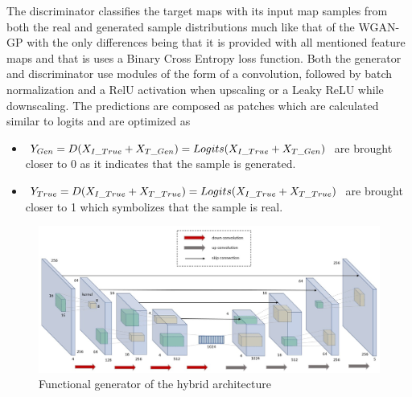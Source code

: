 \documentclass{Configuration_Files/PoliMi3i_thesis}
\begin{document}
The discriminator classifies the target maps with its input map samples from both the
 real and generated sample distributions much like that of the WGAN-GP with the only 
differences being that it is provided with all mentioned feature maps and that is uses a 
Binary Cross Entropy loss function. Both the generator and discriminator use modules of the 
form of a convolution, followed by batch normalization and a RelU activation when upscaling 
or a Leaky ReLU while downscaling. The predictions are composed as patches which are 
calculated similar to logits and are optimized as 
\begin{itemize}
\item $Y_{Gen} = D(X_{I\char`_True}+X_{T\char`_Gen}) = Logits(X_{I\char`_True}+X_{T\char`_Gen})$ are brought closer to 0 as it indicates that the
sample is generated.
\item $Y_{True} = D(X_{I\char`_True}+X_{T\char`_True}) = Logits(X_{I\char`_True}+X_{T\char`_True})$ are brought closer to 1 which symbolizes that the sample is real. 
\end{itemize}
\begin{figure}[H]
    \centering
    \includegraphics[width=1\textwidth]{unet.jpg}
    \caption{Functional generator of the hybrid architecture}
    \label{fig:unet}
\end{figure}
\end{document}

